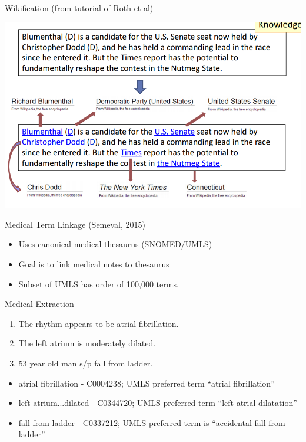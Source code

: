 \documentclass{beamer}
\begin{document}
\begin{frame}{Wikification (from tutorial of Roth et al)}
  \begin{center}
    \includegraphics[width=\textwidth]{wikification}
  \end{center}
\end{frame}

\begin{frame}{Medical Term Linkage (Semeval, 2015) }
  \begin{itemize}
  \item Uses canonical medical thesaurus (SNOMED/UMLS)
    \air 
  \item Goal is to link medical notes to thesaurus
    \air 

  \item Subset of UMLS has order of 100,000 terms.
  \end{itemize}
\end{frame}

\begin{frame}{Medical Extraction}

  \begin{enumerate}
  \item The rhythm appears to be atrial fibrillation.  
  \item The left atrium is moderately dilated.  
  \item 53 year old man s/p fall from ladder.
  \end{enumerate}

  \begin{itemize}
  \item atrial fibrillation - C0004238; UMLS preferred term ``atrial fibrillation''
  \item left atrium...dilated - C0344720; UMLS preferred term ``left atrial dilatation''
  \item fall from ladder - C0337212; UMLS preferred term is ``accidental fall from ladder''  
  \end{itemize}
\end{frame}
\end{document}
